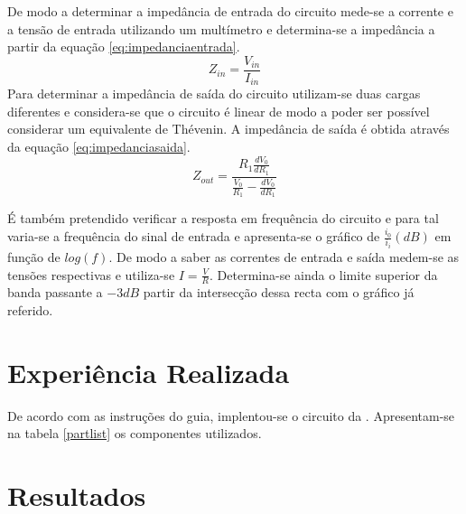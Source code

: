 \documentclass[%
  reprint,
  nofootinbib,
  amsmath,amssymb,
  aps,
  10pt,
  a4paper
]{revtex4-1}
\begin{document}
De modo a determinar a impedância de entrada do circuito mede-se a corrente e a tensão de entrada utilizando um multímetro e determina-se a impedância a partir da equação \ref{eq:impedanciaentrada}.
\begin{equation}
Z_{in}=\frac{V_{in}}{I_{in}}
\label{eq:impedanciaentrada}
\end{equation}
Para determinar a impedância de saída do circuito utilizam-se duas cargas diferentes e considera-se que o circuito é linear de modo a poder ser possível considerar um equivalente de Thévenin. A impedância de saída é obtida através da equação \ref{eq:impedanciasaida}.
\begin{equation}
Z_{out}=\frac{R_1 \frac{dV_0}{dR_1}}{\frac{V_0}{R_1}-\frac{dV_0}{dR_1}}
\label{eq:impedanciasaida}
\end{equation}

É também pretendido verificar a resposta em frequência do circuito e para tal varia-se a frequência do sinal de entrada e apresenta-se o gráfico de $\frac{i_0}{i_i} (dB)$ em função de $log(f)$. De modo a saber as correntes de entrada e saída medem-se as tensões respectivas e utiliza-se $I=\frac{V}{R}$. Determina-se ainda o limite superior da banda passante a $-3dB$ partir da intersecção dessa recta com o gráfico já referido. 

\section{Experiência Realizada}
\label{s:expreal}
De acordo com as instruções do guia, implentou-se o circuito da . Apresentam-se na tabela \ref{partlist} os componentes utilizados.





\section{Resultados}
\label{s:resul}
\end{document}
